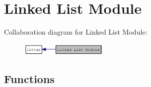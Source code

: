 \hypertarget{group__linklistmod}{
\section{Linked List Module}
\label{group__linklistmod}
}


Collaboration diagram for Linked List Module:\nopagebreak
\begin{figure}[H]
\begin{center}
\leavevmode
\includegraphics[width=119pt]{group__linklistmod}
\end{center}
\end{figure}
\subsection*{Functions}
